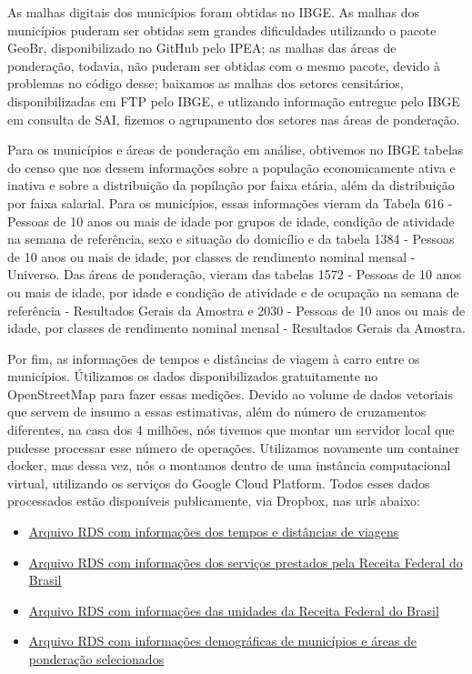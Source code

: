 \documentclass[]{article}
\providecommand{\tightlist}{%
  \setlength{\itemsep}{0pt}\setlength{\parskip}{0pt}}
\begin{document}
As malhas digitais dos municípios foram obtidas no IBGE. As malhas dos
municípios puderam ser obtidas sem grandes dificuldades utilizando o
pacote GeoBr, disponibilizado no GitHub pelo IPEA; as malhas das áreas
de ponderação, todavia, não puderam ser obtidas com o mesmo pacote,
devido à problemas no código desse; baixamos as malhas dos setores
censitários, disponibilizadas em FTP pelo IBGE, e utlizando informação
entregue pelo IBGE em consulta de SAI, fizemos o agrupamento dos setores
nas áreas de ponderação.

Para os municípios e áreas de ponderação em análise, obtivemos no IBGE
tabelas do censo que nos dessem informações sobre a população
economicamente ativa e inativa e sobre a distribuição da popílação por
faixa etária, além da distribuição por faixa salarial. Para os
municípios, essas informações vieram da Tabela 616 - Pessoas de 10 anos
ou mais de idade por grupos de idade, condição de atividade na semana de
referência, sexo e situação do domicílio e da tabela 1384 - Pessoas de
10 anos ou mais de idade, por classes de rendimento nominal mensal -
Universo. Das áreas de ponderação, vieram das tabelas 1572 - Pessoas de
10 anos ou mais de idade, por idade e condição de atividade e de
ocupação na semana de referência - Resultados Gerais da Amostra e 2030 -
Pessoas de 10 anos ou mais de idade, por classes de rendimento nominal
mensal - Resultados Gerais da Amostra.

Por fim, as informações de tempos e distâncias de viagem à carro entre
os municípios. Útilizamos os dados disponibilizados gratuitamente no
OpenStreetMap para fazer essas medições. Devido ao volume de dados
vetoriais que servem de insumo a essas estimativas, além do número de
cruzamentos diferentes, na casa dos 4 milhões, nós tivemos que montar um
servidor local que pudesse processar esse número de operações.
Utilizamos novamente um container docker, mas dessa vez, nós o montamos
dentro de uma instância computacional virtual, utilizando os serviços do
Google Cloud Platform. Todos esses dados processados estão disponíveis
publicamente, via Dropbox, nas urls abaixo:

\begin{itemize}
\tightlist
\item
  \href{https://www.dropbox.com/s/jkiiwwxz73eys9e/01_viagens.rds?raw=1}{Arquivo
  RDS com informações dos tempos e distâncias de viagens}
\item
  \href{https://www.dropbox.com/s/84hrt2ntrx9k0t0/02_servi\%C3\%A7os.rds?raw=1}{Arquivo
  RDS com informações dos serviços prestados pela Receita Federal do
  Brasil}
\item
  \href{https://www.dropbox.com/s/qaypq8bsoa5gfoa/04_unidadesRFB.rds?raw=1}{Arquivo
  RDS com informações das unidades da Receita Federal do Brasil}
\item
  \href{https://www.dropbox.com/s/stsxm0cl98lmnzg/03_demografia.rds?raw=1}{Arquivo
  RDS com informações demográficas de municípios e áreas de ponderação
  selecionados}
\end{itemize}
\end{document}
